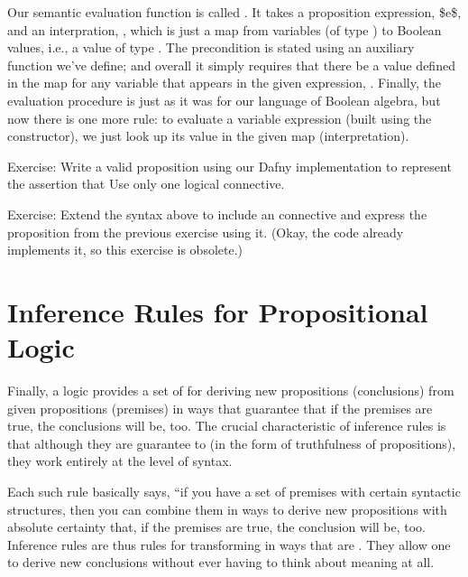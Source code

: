 \documentclass[letterpaper,10pt,english]{sphinxmanual}
\begin{document}
Our semantic evaluation function is called . It takes a
proposition expression, \$e\$, and an interpration, , which is just a
map from variables (of type ) to Boolean values, i.e., a
value of type . The precondition is stated using an
auxiliary function we’ve define; and overall it simply requires that
there be a value defined in the map for any variable that appears in
the given expression, . Finally, the evaluation procedure is just
as it was for our language of Boolean algebra, but now there is one
more rule: to evaluate a variable expression (built using the
 constructor), we just look up its value in the given map
(interpretation).

Exercise: Write a valid proposition using our Dafny implementation to
represent the assertion that  Use only one logical connective.

Exercise: Extend the syntax above to include an  connective
and express the proposition from the previous exercise using it. (Okay,
the code already implements it, so this exercise is obsolete.)


\section{Inference Rules for Propositional Logic}
\label{\detokenize{11-propositional-logic:inference-rules-for-propositional-logic}}
Finally, a logic provides a set of  for deriving new
propositions (conclusions) from given propositions (premises) in ways
that guarantee that if the premises are true, the conclusions will be,
too. The crucial characteristic of inference rules is that although
they are guarantee to  (in the form of truthfulness
of propositions), they work entirely at the level of syntax.

Each such rule basically says, “if you have a set of premises with
certain syntactic structures, then you can combine them in ways to
derive new propositions with absolute certainty that, if the premises
are true, the conclusion will be, too.  Inference rules are thus rules
for transforming  in ways that are . They
allow one to derive  new conclusions without ever having
to think about meaning at all.
\end{document}
